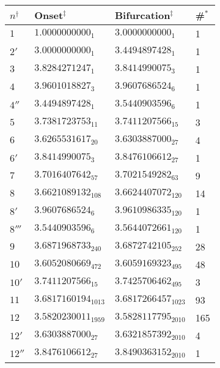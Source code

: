 \documentclass{ws-ijbc}
\begin{document}
\begin{table}[h]\footnotesize
{
\begin{tabular}{llll}
\hline
  $n^\dagger$
& Onset$^\ddagger$
& Bifurcation$^\ddagger$
& \#$^*$ \\
\hline
$1$     & $1.0000000000_1$      &  $3.0000000000_1$       & 1   \\
$2'$    & $3.0000000000_1$      &  $3.4494897428_1$       & 1   \\
$3$     & $3.8284271247_1$      &  $3.8414990075_3$       & 1   \\
$4$     & $3.9601018827_3$      &  $3.9607686524_6$       & 1   \\
$4''$   & $3.4494897428_1$      &  $3.5440903596_6$       & 1   \\
$5$     & $3.7381723753_{11}$   &  $3.7411207566_{15}$    & 3   \\
$6$     & $3.6265531617_{20}$   &  $3.6303887000_{27}$    & 4   \\
$6'$    & $3.8414990075_{3}$    &  $3.8476106612_{27}$    & 1   \\
$7$     & $3.7016407642_{57}$   &  $3.7021549282_{63}$    & 9   \\
$8$     & $3.6621089132_{108}$  &  $3.6624407072_{120}$   & 14  \\
$8'$    & $3.9607686524_{6}$    &  $3.9610986335_{120}$   & 1   \\
$8'''$  & $3.5440903596_{6}$    &  $3.5644072661_{120}$   & 1   \\
$9$     & $3.6871968733_{240}$  &  $3.6872742105_{252}$   & 28  \\
$10$    & $3.6052080669_{472}$  &  $3.6059169323_{495}$   & 48  \\
$10'$   & $3.7411207566_{15}$   &  $3.7425706462_{495}$   & 3   \\
$11$    & $3.6817160194_{1013}$ &  $3.6817266457_{1023}$  & 93  \\
$12$    & $3.5820230011_{1959}$ &  $3.5828117795_{2010}$  & 165 \\
$12'$   & $3.6303887000_{27}$   &  $3.6321857392_{2010}$  & 4   \\
$12''$  & $3.8476106612_{27}$   &  $3.8490363152_{2010}$  & 1   \\

\end{tabular}}
\end{table}
\end{document}
